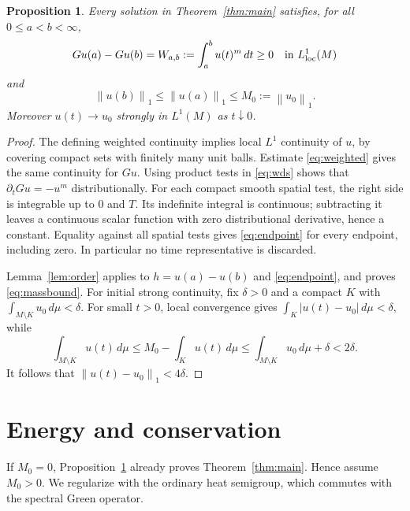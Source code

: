 \documentclass[11pt]{article}
\newtheorem{proposition}[theorem]{Proposition}
\theoremstyle{definition}
\theoremstyle{remark}
\newcommand{\dd}{\,d\mu}
\newcommand{\norm}[1]{\left\|#1\right\|}
\begin{document}
\begin{proposition}\label{prop:massbound}
Every solution in Theorem~\ref{thm:main} satisfies, for all
\(0\le a<b<\infty\),
\begin{equation}\label{eq:endpoint}
 Gu(a)-Gu(b)=W_{a,b}:=\int_a^b u(t)^m\,dt\ge0
 \quad\hbox{in }L^1_{\mathrm{loc}}(M)
\end{equation}
and
\begin{equation}\label{eq:massbound}
 \norm{u(b)}_1\le\norm{u(a)}_1\le M_0:=\norm{u_0}_1 .
\end{equation}
Moreover \(u(t)\to u_0\) strongly in \(L^1(M)\) as \(t\downarrow0\).
\end{proposition}
\begin{proof}
The defining weighted continuity implies local \(L^1\) continuity
of \(u\), by covering compact sets with finitely many unit balls.
Estimate \eqref{eq:weighted} gives the same continuity for \(Gu\).
Using product tests in \eqref{eq:wds} shows that
\(\partial_tGu=-u^m\) distributionally.
For each compact smooth spatial test, the right side is integrable
up to \(0\) and \(T\). Its indefinite integral is continuous;
subtracting it leaves a continuous scalar function with zero
distributional derivative, hence a constant. Equality against all
spatial tests gives \eqref{eq:endpoint} for every endpoint, including
zero. In particular no time representative is discarded.

Lemma~\ref{lem:order} applies to \(h=u(a)-u(b)\) and
\eqref{eq:endpoint}, and proves \eqref{eq:massbound}.
For initial strong continuity, fix \(\delta>0\) and a compact \(K\)
with \(\int_{M\setminus K}u_0\dd<\delta\).
For small \(t>0\), local convergence gives
\(\int_K|u(t)-u_0|\dd<\delta\), while
\[
 \int_{M\setminus K}u(t)\dd
 \le M_0-\int_Ku(t)\dd
 \le\int_{M\setminus K}u_0\dd+\delta<2\delta .
\]
It follows that \(\norm{u(t)-u_0}_1<4\delta\).
\end{proof}

\section{Energy and conservation}\label{sec:energy}

If \(M_0=0\), Proposition~\ref{prop:massbound} already proves
Theorem~\ref{thm:main}. Hence assume \(M_0>0\).
We regularize with the ordinary heat semigroup, which commutes
with the spectral Green operator.
\end{document}
